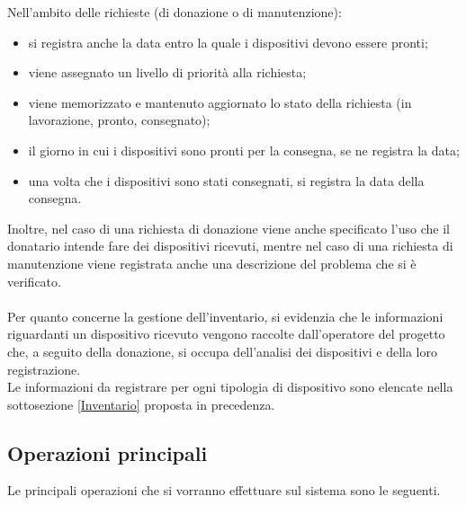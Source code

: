 \documentclass[a4paper,12pt]{report}
\begin{document}
\noindent Nell'ambito delle richieste (di donazione o di manutenzione):
\begin{itemize}
	\item si registra anche la data entro la quale i dispositivi devono essere pronti;
	\item viene assegnato un livello di priorità alla richiesta;
	\item viene memorizzato e mantenuto aggiornato lo stato della richiesta (in lavorazione, pronto, consegnato);
	\item il giorno in cui i dispositivi sono pronti per la consegna, se ne registra la data;
	\item una volta che i dispositivi sono stati consegnati, si registra la data della consegna.
\end{itemize}
\noindent Inoltre, nel caso di una richiesta di donazione viene anche specificato l’uso che il donatario intende fare dei dispositivi ricevuti, mentre nel caso di una richiesta di manutenzione viene registrata anche una descrizione del problema che si è verificato.
\\\\
Per quanto concerne la gestione dell'inventario, si evidenzia che le informazioni riguardanti un dispositivo ricevuto vengono raccolte dall'operatore del progetto che, a seguito della donazione, si occupa dell'analisi dei dispositivi e della loro registrazione.
\\
Le informazioni da registrare per ogni tipologia di dispositivo sono elencate nella sottosezione \ref{Inventario} proposta in precedenza.

\subsection{Operazioni principali} \label{Operazioni}

Le principali operazioni che si vorranno effettuare sul sistema sono le seguenti.
\end{document}
